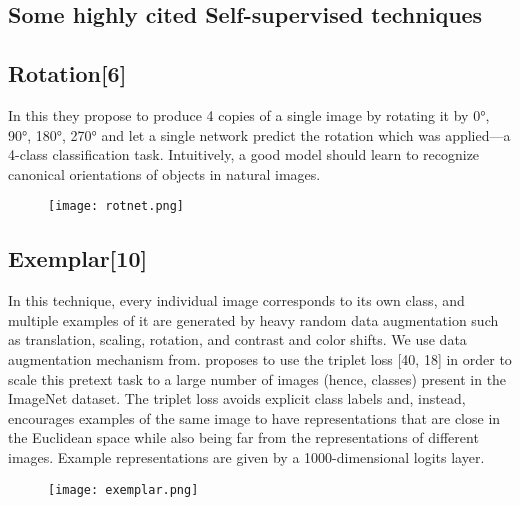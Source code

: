\documentclass[a4paper, 12pt]{article}
\begin{document}
\newpage
\begin{center}
\section{Some highly cited Self-supervised techniques}
\end{center}
\subsection{Rotation[6]}
\par
\hspace{1cm}

In this they propose to produce 4 copies of
a single image by rotating it by {0°, 90°, 180°, 270°} and let
a single network predict the rotation which was applied—a
4-class classification task. Intuitively, a good model should
learn to recognize canonical orientations of objects in natural images.

\begin{figure}[htp]
    \centering
    \texttt{[image: rotnet.png]}

\end{figure}
\subsection{Exemplar[10]}
\par
\hspace{1cm}
 In this technique, every individual image corresponds to its own class, and multiple examples of it
are generated by heavy random data augmentation such as
translation, scaling, rotation, and contrast and color shifts.
We use data augmentation mechanism from. proposes to use the triplet loss [40, 18] in order to scale this
pretext task to a large number of images (hence, classes)
present in the ImageNet dataset. The triplet loss avoids explicit class labels and, instead, encourages examples of the
same image to have representations that are close in the Euclidean space while also being far from the representations
of different images. Example representations are given by a
1000-dimensional logits layer.
\begin{figure}[htp]
    \centering
    \texttt{[image: exemplar.png]}

\end{figure}



\end{document}
